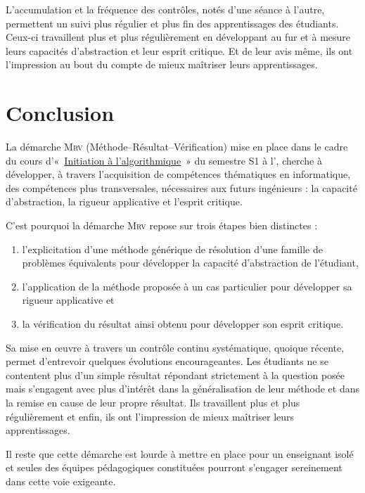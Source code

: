 L'accumulation et la fréquence des contrôles, notés d'une séance à l'autre, 
permettent un suivi plus régulier et plus fin des apprentissages des étudiants.
Ceux-ci travaillent plus et plus régulièrement en développant au fur et à mesure
leurs capacités d'abstraction et leur esprit critique.
Et de leur avis même, ils ont l'impression au bout du compte de mieux maîtriser 
leurs apprentissages.

\section{Conclusion}\label{sec:conclusion}
La démarche \textsc{Mrv} (Méthode--Résultat--Vérification) mise en place dans le cadre du cours
d'«~\href{http://www.enib.fr/~tisseau/pdf/course/info-S1.pdf}{Initiation à l'algorithmique}~» 
du semestre S1 à l'\enib, cherche à développer, à travers l'acquisition de compétences
thématiques en informatique, des compétences plus transversales, nécessaires aux futurs ingénieurs :
la capacité d'abstraction, la rigueur applicative et l'esprit critique.

C'est pourquoi la démarche \textsc{Mrv} repose sur trois étapes bien distinctes :
\begin{enumerate}
\item l'explicitation d'une méthode générique de résolution d'une famille de 
	problèmes équivalents pour développer la capacité d'abstraction de l'étudiant,
\item l'application de la méthode proposée à un cas particulier pour développer 
	sa rigueur applicative et 
\item la vérification du résultat ainsi obtenu pour développer son esprit critique.
\end{enumerate}

Sa mise en \oe uvre à travers un contrôle continu systématique, quoique récente,
permet d'entrevoir quelques évolutions encourageantes.
Les étudiants ne se contentent plus d'un simple résultat répondant strictement 
à la question posée mais s'engagent avec plus d'intérêt dans la généralisation 
de leur méthode et dans la remise en cause de leur propre résultat.
Ils travaillent plus et plus régulièrement et enfin, ils ont l'impression de mieux
maîtriser leurs apprentissages.

Il reste que cette démarche est lourde à mettre en place pour un enseignant isolé
et seules des équipes pédagogiques constituées pourront s'engager sereinement 
dans cette voie exigeante.

